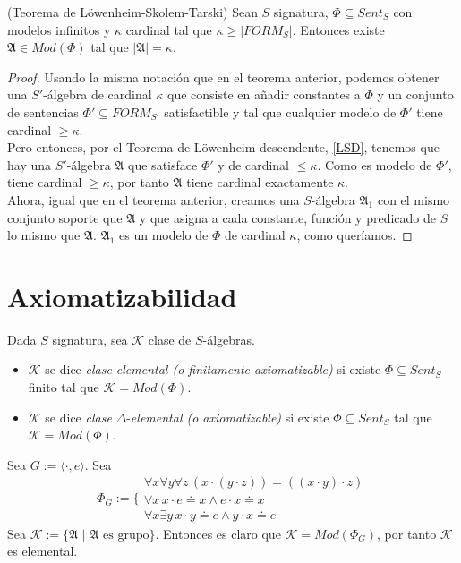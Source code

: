 \begin{theorem}(Teorema de Löwenheim-Skolem-Tarski)\label{LST} Sean $S$ signatura, $\Phi \subseteq Sent_S$ con modelos infinitos y $\kappa$ cardinal tal que $\kappa \geq |FORM_S|$. Entonces existe $\mathfrak{A} \in Mod(\Phi)$ tal que $|\mathfrak{A}| = \kappa$.
\end{theorem}
\begin{proof}
Usando la misma notación que en el teorema anterior, podemos obtener una $S'$-álgebra de cardinal $\kappa$ que consiste en añadir constantes a $\Phi$ y un conjunto de sentencias $\Phi'\subseteq FORM_{S'}$ satisfactible y tal que cualquier modelo de $\Phi'$ tiene cardinal $\geq\kappa$.\\

Pero entonces, por el Teorema de Löwenheim descendente, \ref{LSD}, tenemos que hay una $S'$-álgebra $\mathfrak{A}$ que satisface $\Phi'$ y de cardinal $\leq\kappa$. Como es modelo de $\Phi'$, tiene cardinal $\geq\kappa$, por tanto $\mathfrak{A}$ tiene  cardinal exactamente $\kappa$.\\

Ahora, igual que en el teorema anterior, creamos una $S$-álgebra $\mathfrak{A}_1$ con el mismo conjunto soporte que $\mathfrak{A}$ y que asigna a cada constante, función y predicado de $S$ lo mismo que $\mathfrak{A}$. $\mathfrak{A}_1$ es un modelo de $\Phi$ de cardinal $\kappa$, como queríamos.
\end{proof}

\section{Axiomatizabilidad}


\begin{defs}
Dada $S$ signatura, sea $\mathcal{K}$ clase de $S$-álgebras.
\mbox{}
\begin{itemize}
    \item $\mathcal{K}$ se dice \textit{clase elemental (o finitamente axiomatizable)} si existe $\Phi \subseteq Sent_S$ finito tal que $\mathcal{K} = Mod(\Phi)$.
    \item $\mathcal{K}$ se dice \textit{clase} $\Delta$-\textit{elemental (o axiomatizable)} si existe $\Phi \subseteq Sent_S$ tal que $\mathcal{K} = Mod(\Phi)$.
\end{itemize}
\end{defs}

\begin{example}
Sea $G := \langle \cdot, e \rangle$. Sea 
\[
    \Phi_G := \Bigg\{\begin{array}{lr}
       \forall x \forall y \forall z \, (x \cdot(y\cdot z))= ((x \cdot y) \cdot z)\\
       \forall x \, x\cdot e \doteq x\land e \cdot x \doteq x\\
        \forall x \exists y \, x\cdot y \doteq e \land y\cdot x \doteq e
        \end{array} 
\]
Sea $\mathcal{K}:=\{\mathfrak{A} \, \, | \, \, \mathfrak{A} \text{ es grupo}\}$. Entonces es claro que $\mathcal{K} = Mod(\Phi_G)$, por tanto $\mathcal{K}$ es elemental.
\end{example}

